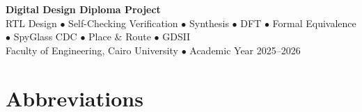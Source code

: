 \documentclass[11pt,a4paper]{article}
\begin{document}
\begin{titlepage}
\vfill

\begin{center}
    {\textbf{\textcolor{accent}{Digital Design Diploma Project}}}\\[0.1cm]
    {\footnotesize RTL Design $\bullet$ Self-Checking Verification $\bullet$ Synthesis $\bullet$ DFT $\bullet$ Formal Equivalence $\bullet$ SpyGlass CDC $\bullet$ Place \& Route $\bullet$ GDSII}\\[0.15cm]
    {\footnotesize Faculty of Engineering, Cairo University $\bullet$ Academic Year 2025--2026}
\end{center}

\end{titlepage}

\newpage
\hypersetup{linkcolor=black}
\tableofcontents

\newpage
\listoffigures

\newpage
\listoftables
\hypersetup{linkcolor=primary}

\newpage
{}
{}
\section*{Abbreviations}
\end{document}
